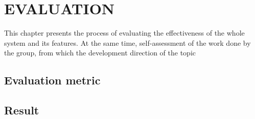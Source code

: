 \chapter{EVALUATION}
This chapter presents the process of evaluating the effectiveness of the whole system and its features. At the same time, self-assessment of the work done by the group, from which the development direction of the topic

\section{Evaluation metric}
\section{Result}

